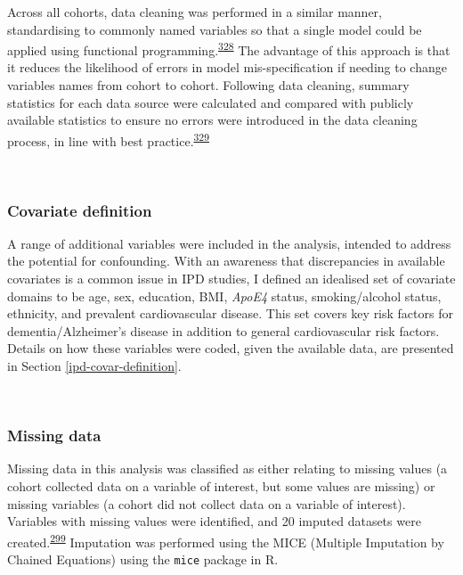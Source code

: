 \documentclass[a4paper, twoside]{templates/ociamthesis}
\begin{document}
Across all cohorts, data cleaning was performed in a similar manner, standardising to commonly named variables so that a single model could be applied using functional programming.\textsuperscript{\protect\hyperlink{ref-wickham2016func}{328}} The advantage of this approach is that it reduces the likelihood of errors in model mis-specification if needing to change variables names from cohort to cohort. Following data cleaning, summary statistics for each data source were calculated and compared with publicly available statistics to ensure no errors were introduced in the data cleaning process, in line with best practice.\textsuperscript{\protect\hyperlink{ref-levis2021}{329}}

~

\hypertarget{covariate-definition}{%
\subsubsection{Covariate definition}\label{covariate-definition}}

A range of additional variables were included in the analysis, intended to address the potential for confounding. With an awareness that discrepancies in available covariates is a common issue in IPD studies, I defined an idealised set of covariate domains to be age, sex, education, BMI, \emph{ApoE4} status, smoking/alcohol status, ethnicity, and prevalent cardiovascular disease. This set covers key risk factors for dementia/Alzheimer's disease in addition to general cardiovascular risk factors. Details on how these variables were coded, given the available data, are presented in Section \ref{ipd-covar-definition}.

~

\hypertarget{missing-data-2}{%
\subsubsection{Missing data}\label{missing-data-2}}

Missing data in this analysis was classified as either relating to missing values (a cohort collected data on a variable of interest, but some values are missing) or missing variables (a cohort did not collect data on a variable of interest). Variables with missing values were identified, and 20 imputed datasets were created.\textsuperscript{\protect\hyperlink{ref-sterne2009}{299}} Imputation was performed using the MICE (Multiple Imputation by Chained Equations) using the \texttt{mice} package in R.
\end{document}
